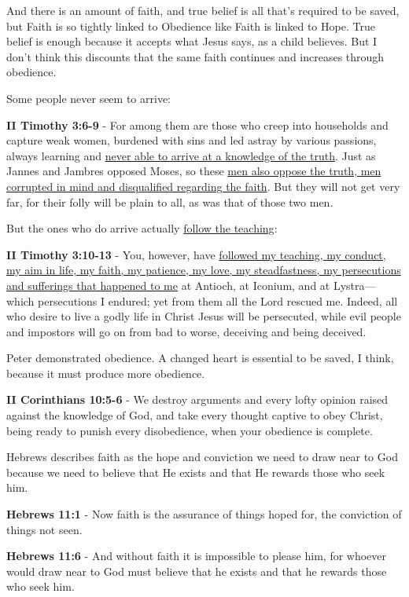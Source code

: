 \documentclass[11pt]{article}
\begin{document}
And there is an amount of faith, and true belief is all that's required to be saved, but Faith is so tightly linked to Obedience like Faith is linked to Hope. True belief is enough because it accepts what Jesus says, as a child believes. But I don't think this discounts that the same faith continues and increases through obedience.

Some people never seem to arrive:

\textbf{II Timothy 3:6-9} - For among them are those who creep into households and capture weak women, burdened with sins and led astray by various passions, always learning and \uline{never able to arrive at a knowledge of the truth}. Just as Jannes and Jambres opposed Moses, so these \uline{men also oppose the truth, men corrupted in mind and disqualified regarding the faith}. But they will not get very far, for their folly will be plain to all, as was that of those two men.

But the ones who do arrive actually \uline{follow the teaching}:

\textbf{II Timothy 3:10-13} - You, however, have \uline{followed my teaching, my conduct, my aim in life, my faith, my patience, my love, my steadfastness, my persecutions and sufferings that happened to me} at Antioch, at Iconium, and at Lystra—which persecutions I endured; yet from them all the Lord rescued me. Indeed, all who desire to live a godly life in Christ Jesus will be persecuted, while evil people and impostors will go on from bad to worse, deceiving and being deceived.

Peter demonstrated obedience. A changed heart is essential to be saved, I think, because it must produce more obedience.

\textbf{II Corinthians 10:5-6} - We destroy arguments and every lofty opinion raised against the knowledge of God, and take every thought captive to obey Christ, being ready to punish every disobedience, when your obedience is complete.

Hebrews describes faith as the hope and conviction we need to draw near to God because we need to believe that He exists and that He rewards those who seek him.

\textbf{Hebrews 11:1} - Now faith is the assurance of things hoped for, the conviction of things not seen.

\textbf{Hebrews 11:6} - And without faith it is impossible to please him, for whoever would draw near to God must believe that he exists and that he rewards those who seek him.
\end{document}

